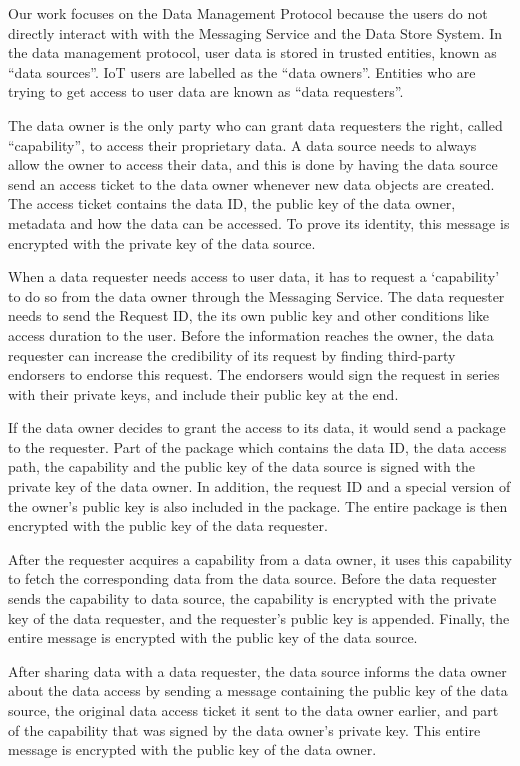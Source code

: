 Our work focuses on the Data Management Protocol because the users do not directly interact with with the Messaging Service and the Data Store System. In the data management protocol, user data is stored in trusted entities, known as ``data sources''. IoT users are labelled as the ``data owners''. Entities who are trying to get access to user data are known as ``data requesters''. 

The data owner is the only party who can grant data requesters the right, called ``capability'', to access their proprietary data. A data source needs to always allow the owner to access their data, and this is done by having the data source send an access ticket to the data owner whenever new data objects are created. The access ticket contains the data ID, the public key of the data owner, metadata and how the data can be accessed. To prove its identity, this message is encrypted with the private key of the data source.

When a data requester needs access to user data, it has to request a `capability' to do so from the data owner through the Messaging Service. The data requester needs to send the Request ID, the its own public key and other conditions like access duration to the user. Before the information reaches the owner, the data requester can increase the credibility of its request by finding third-party endorsers to endorse this request. The endorsers would sign the request in series with their private keys, and include their public key at the end.

If the data owner decides to grant the access to its data, it would send a package to the requester. Part of the package which contains the data ID, the data access path, the capability and the public key of the data source is signed with the private key of the data owner. In addition, the request ID and a special version of the owner’s public key is also included in the package. The entire package is then encrypted with the public key of the data requester.

After the requester acquires a capability from a data owner, it uses this capability to fetch the corresponding data from the data source. Before the data requester sends the capability to data source, the capability is encrypted with the private key of the data requester, and the requester’s public key is appended. Finally, the entire message is encrypted with the public key of the data source.

After sharing data with a data requester, the data source informs the data owner about the data access by sending a message containing the public key of the data source, the original data access ticket it sent to the data owner earlier, and part of the capability that was signed by the data owner’s private key. This entire message is encrypted with the public key of the data owner.

